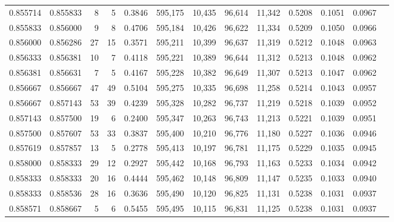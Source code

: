 \begin{tabular}{rrrrrrrrrrrrr}
0.855714 & 0.855833 &     8 &   5 &                                     0.3846 & 595,175 &  10,435 &  96,614 &  11,342 & 0.5208 & 0.1051 & 0.0967 \\
0.855833 & 0.856000 &     9 &   8 &                                     0.4706 & 595,184 &  10,426 &  96,622 &  11,334 & 0.5209 & 0.1050 & 0.0966 \\
0.856000 & 0.856286 &    27 &  15 &                                     0.3571 & 595,211 &  10,399 &  96,637 &  11,319 & 0.5212 & 0.1048 & 0.0963 \\
0.856333 & 0.856381 &    10 &   7 &                                     0.4118 & 595,221 &  10,389 &  96,644 &  11,312 & 0.5213 & 0.1048 & 0.0962 \\
0.856381 & 0.856631 &     7 &   5 &                                     0.4167 & 595,228 &  10,382 &  96,649 &  11,307 & 0.5213 & 0.1047 & 0.0962 \\
0.856667 & 0.856667 &    47 &  49 &                                     0.5104 & 595,275 &  10,335 &  96,698 &  11,258 & 0.5214 & 0.1043 & 0.0957 \\
0.856667 & 0.857143 &    53 &  39 &                                     0.4239 & 595,328 &  10,282 &  96,737 &  11,219 & 0.5218 & 0.1039 & 0.0952 \\
0.857143 & 0.857500 &    19 &   6 &                                     0.2400 & 595,347 &  10,263 &  96,743 &  11,213 & 0.5221 & 0.1039 & 0.0951 \\
0.857500 & 0.857607 &    53 &  33 &                                     0.3837 & 595,400 &  10,210 &  96,776 &  11,180 & 0.5227 & 0.1036 & 0.0946 \\
0.857619 & 0.857857 &    13 &   5 &                                     0.2778 & 595,413 &  10,197 &  96,781 &  11,175 & 0.5229 & 0.1035 & 0.0945 \\
0.858000 & 0.858333 &    29 &  12 &                                     0.2927 & 595,442 &  10,168 &  96,793 &  11,163 & 0.5233 & 0.1034 & 0.0942 \\
0.858333 & 0.858333 &    20 &  16 &                                     0.4444 & 595,462 &  10,148 &  96,809 &  11,147 & 0.5235 & 0.1033 & 0.0940 \\
0.858333 & 0.858536 &    28 &  16 &                                     0.3636 & 595,490 &  10,120 &  96,825 &  11,131 & 0.5238 & 0.1031 & 0.0937 \\
0.858571 & 0.858667 &     5 &   6 &                                     0.5455 & 595,495 &  10,115 &  96,831 &  11,125 & 0.5238 & 0.1031 & 0.0937 \\

\end{tabular}
